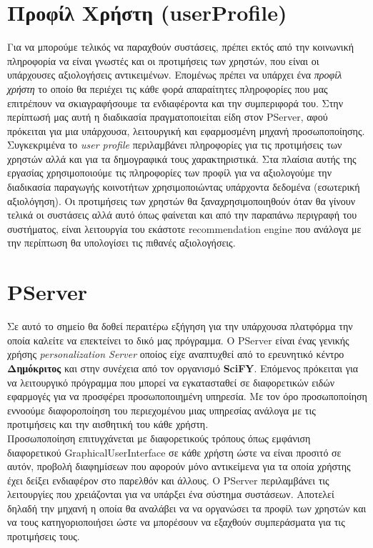 \section{Προφίλ Χρήστη (userProfile)}
\noindent
Για να μπορούμε τελικός να παραχθούν συστάσεις, πρέπει εκτός από την κοινωνική πληροφορία να είναι γνωστές και οι προτιμήσεις των χρηστών, που είναι οι υπάρχουσες αξιολογήσεις αντικειμένων. 
Επομένως πρέπει να υπάρχει ένα \emph{προφίλ χρήστη} το οποίο θα περιέχει τις κάθε φορά απαραίτητες πληροφορίες 
που μας επιτρέπουν να σκιαγραφήσουμε τα ενδιαφέροντα και την συμπεριφορά του. Στην περίπτωσή μας αυτή η διαδικασία πραγματοποιείται είδη στον PServer, 
αφού πρόκειται για μια υπάρχουσα, λειτουργική και εφαρμοσμένη μηχανή προσωποποίησης. Συγκεκριμένα το \emph{user profile} περιλαμβάνει πληροφορίες για τις προτιμήσεις των χρηστών αλλά και
για τα δημογραφικά τους χαρακτηριστικά. Στα πλαίσια αυτής της εργασίας χρησιμοποιούμε τις πληροφορίες των προφίλ για να αξιολογούμε την διαδικασία παραγωγής κοινοτήτων χρησιμοποιώντας 
υπάρχοντα δεδομένα (εσωτερική αξιολόγηση). Οι προτιμήσεις των χρηστών θα ξαναχρησιμοποιηθούν όταν θα γίνουν τελικά οι συστάσεις αλλά αυτό όπως φαίνεται και από την παραπάνω περιγραφή του συστήματος, είναι 
λειτουργία του εκάστοτε recommendation engine που ανάλογα με την περίπτωση θα υπολογίσει τις πιθανές αξιολογήσεις.

\section{PServer}
\label{PServer}
\noindent
Σε αυτό το σημείο θα δοθεί περαιτέρω εξήγηση για την υπάρχουσα πλατφόρμα την οποία καλείτε να επεκτείνει το δικό μας πρόγραμμα. 
Ο PServer\cite{pServer} είναι ένας γενικής χρήσης \emph{personalization Server} οποίος είχε αναπτυχθεί από το ερευνητικό κέντρο \textbf{Δημόκριτος} και στην συνέχεια από τον οργανισμό \textbf{SciFY}.
Επόμενος πρόκειται για να λειτουργικό πρόγραμμα που μπορεί να εγκατασταθεί σε διαφορετικών ειδών εφαρμογές
για να προσφέρει προσωποποιημένη υπηρεσία. Με τον όρο προσωποποίηση εννοούμε διαφοροποίηση του περιεχομένου μιας υπηρεσίας ανάλογα με τις προτιμήσεις και την αισθητική του κάθε χρήστη.
\cite{pServerUserGuide}\\
Προσωποποίηση επιτυγχάνεται με διαφορετικούς τρόπους όπως εμφάνιση διαφορετικού GraphicalUserInterface σε κάθε χρήστη ώστε να είναι 
προσιτό σε αυτόν, προβολή διαφημίσεων που αφορούν μόνο αντικείμενα για τα οποία χρήστης έχει δείξει ενδιαφέρον στο παρελθόν και άλλους. 
Ο PServer περιλαμβάνει τις λειτουργίες που χρειάζονται για να υπάρξει ένα σύστημα συστάσεων. Αποτελεί δηλαδή την μηχανή η οποία θα αναλάβει να 
να οργανώσει τα προφίλ των χρηστών και να τους κατηγοριοποιήσει ώστε να μπορέσουν να εξαχθούν συμπεράσματα για τις προτιμήσεις τους.\\



